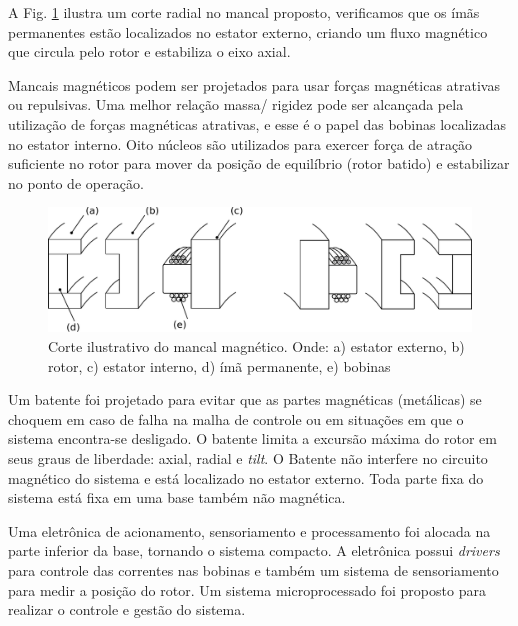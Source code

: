 A Fig. \ref{fig:mancal:corte} ilustra um corte radial no mancal proposto, verificamos que os ímãs permanentes estão localizados no estator externo, criando um fluxo magnético que circula pelo rotor e estabiliza o eixo axial.

Mancais magnéticos podem ser projetados para usar forças magnéticas atrativas ou repulsivas. Uma melhor relação massa/ rigidez pode ser alcançada pela utilização de forças magnéticas atrativas, e esse é o papel das bobinas localizadas no estator interno. Oito núcleos são utilizados para exercer força de atração suficiente no rotor para mover da posição de equilíbrio (rotor batido) e estabilizar no ponto de operação. 

\begin{figure}[ht!]
	\centering
	\includegraphics[width=1\linewidth]{./Figs/mancais/mancal_corte}
	\caption[Corte ilustrativo do mancal magnético]{Corte ilustrativo do mancal magnético. Onde: a) estator externo, b) rotor, c) estator interno, d) ímã permanente, e) bobinas}
	\label{fig:mancal:corte}
\end{figure}

Um batente foi projetado para evitar que as partes magnéticas (metálicas) se choquem em caso de falha na malha de controle ou em situações em que o sistema encontra-se desligado. O batente limita a excursão máxima do rotor em seus graus de liberdade: axial, radial e \textit{tilt}. O Batente não interfere no circuito magnético do sistema e está localizado no estator externo. Toda parte fixa do sistema está fixa em uma base também não magnética.

Uma eletrônica de acionamento, sensoriamento e processamento foi alocada na parte inferior da base, tornando o sistema compacto. A eletrônica possui \textit{drivers} para controle das correntes nas bobinas e também um sistema de sensoriamento para medir a posição do rotor. Um sistema microprocessado foi proposto para realizar o controle e gestão do sistema.

%

